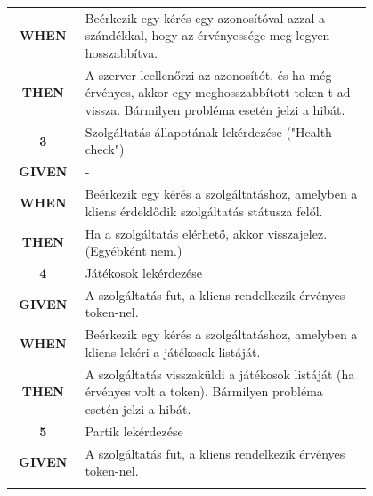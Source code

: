 \documentclass[twoside, a4paper, 12pt]{book}
\begin{document}
\begin{longtable}[c]{|c|p{0.8\linewidth}|}
	\textbf{WHEN} &
	Beérkezik egy kérés egy azonosítóval azzal a szándékkal, hogy az érvényessége meg legyen hosszabbítva.
	\\
	\nobreakhline
	
	\textbf{THEN} &
	A szerver leellenőrzi az azonosítót, és ha még érvényes, akkor egy meghosszabbított token-t ad vissza.
	Bármilyen probléma esetén jelzi a hibát.
	\\
	\hline
	
	
	\rowcolor[HTML]{CBCEFB} 
	\textbf{3}
	&	Szolgáltatás állapotának lekérdezése ("Health-check")
	\\ \nobreakhline
	
	\textbf{GIVEN} &
	-
	\\ \nobreakhline
	
	\textbf{WHEN} &
	Beérkezik egy kérés a szolgáltatáshoz, amelyben a kliens érdeklődik szolgáltatás státusza felől.
	\\
	\nobreakhline
	
	\textbf{THEN} &
	Ha a szolgáltatás elérhető, akkor visszajelez. (Egyébként nem.)
	\\
	\hline
	
	
	\rowcolor[HTML]{CBCEFB} 
	\textbf{4}
	&	Játékosok lekérdezése
	\\ \nobreakhline
	
	\textbf{GIVEN} &
	A szolgáltatás fut, a kliens rendelkezik érvényes token-nel.
	\\ \nobreakhline
	
	\textbf{WHEN} &
	Beérkezik egy kérés a szolgáltatáshoz, amelyben a kliens lekéri a játékosok listáját.
	\\
	\nobreakhline
	
	\textbf{THEN} &
	A szolgáltatás visszaküldi a játékosok listáját (ha érvényes volt a token).
	Bármilyen probléma esetén jelzi a hibát.
	\\
	\hline
	
	
	\rowcolor[HTML]{CBCEFB} 
	\textbf{5}
	&	Partik lekérdezése
	\\ \nobreakhline
	
	\textbf{GIVEN} &
	A szolgáltatás fut, a kliens rendelkezik érvényes token-nel.
	\\ \nobreakhline
	

\end{longtable}
\end{document}
